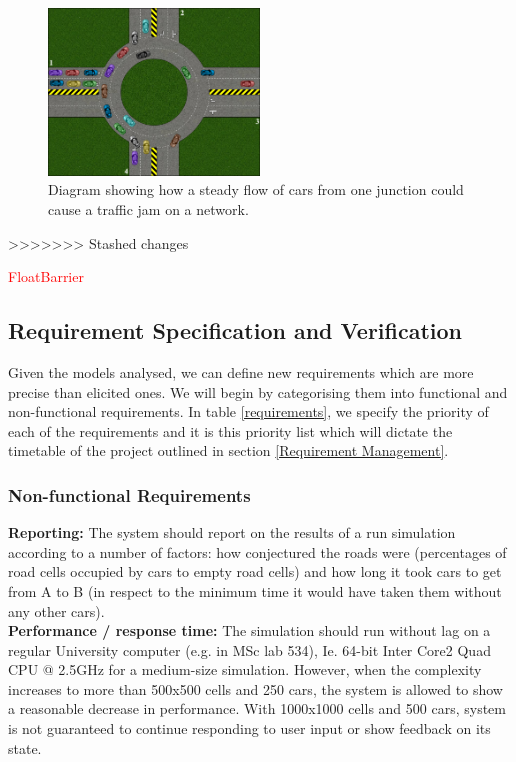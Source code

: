 \documentclass{article}
\begin{document}
	
	\begin{figure}[h]
		\centering
		\includegraphics[width=0.5\textwidth]{SteadyFlow}
		\caption{Diagram showing how a steady flow of cars from one junction could cause a traffic jam on a network. }
		\label{SteadyFlow}
	\end{figure} 
>>>>>>> Stashed changes

\textcolor{red}{FloatBarrier}
	\subsection{Requirement Specification and Verification}
	
	Given the models analysed, we can define new requirements which are more precise than elicited ones. We will begin by categorising them into functional and non-functional requirements. In table \ref{requirements}, we specify the priority of each of the requirements and it is this priority list which will dictate the timetable of the project outlined in section \ref{Requirement Management}.\\
	
	\subsubsection{Non-functional Requirements}
	\textbf{Reporting:} The system should report on the results of a run simulation according to a number of factors: how conjectured the roads were (percentages of road cells occupied by cars to empty road cells) and how long it took cars to get from A to B (in respect to the minimum time it would have taken them without any other cars).\\
	
	\noindent
	\textbf{Performance / response time:} The simulation should run without lag on a regular University computer (e.g. in MSc lab 534), Ie. 64-bit Inter Core2 Quad CPU @ 2.5GHz for a medium-size simulation. 
	However, when the complexity increases to more than 500x500 cells and 250 cars, the system is allowed to show a reasonable decrease in performance. 
	With 1000x1000 cells and 500 cars, system is not guaranteed to continue responding to user input or show feedback on its state.\\
	
\end{document}
